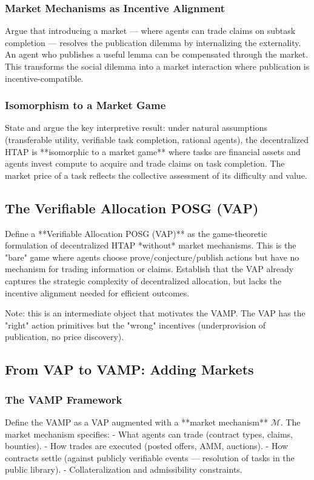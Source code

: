 \subsubsection{Market Mechanisms as Incentive Alignment}
Argue that introducing a market — where agents can trade claims on subtask completion — resolves the publication dilemma by internalizing the externality. An agent who publishes a useful lemma can be compensated through the market. This transforms the social dilemma into a market interaction where publication is incentive-compatible.

\subsubsection{Isomorphism to a Market Game}
State and argue the key interpretive result: under natural assumptions (transferable utility, verifiable task completion, rational agents), the decentralized HTAP is **isomorphic to a market game** where tasks are financial assets and agents invest compute to acquire and trade claims on task completion. The market price of a task reflects the collective assessment of its difficulty and value.

\subsection{The Verifiable Allocation POSG (VAP)}
Define a **Verifiable Allocation POSG (VAP)** as the game-theoretic formulation of decentralized HTAP *without* market mechanisms. This is the "bare" game where agents choose prove/conjecture/publish actions but have no mechanism for trading information or claims. Establish that the VAP already captures the strategic complexity of decentralized allocation, but lacks the incentive alignment needed for efficient outcomes.

Note: this is an intermediate object that motivates the VAMP. The VAP has the "right" action primitives but the "wrong" incentives (underprovision of publication, no price discovery).

\subsection{From VAP to VAMP: Adding Markets}

\subsubsection{The VAMP Framework}
Define the VAMP as a VAP augmented with a **market mechanism** $\mathcal{M}$. The market mechanism specifies:
- What agents can trade (contract types, claims, bounties).
- How trades are executed (posted offers, AMM, auctions).
- How contracts settle (against publicly verifiable events — resolution of tasks in the public library).
- Collateralization and admissibility constraints.

